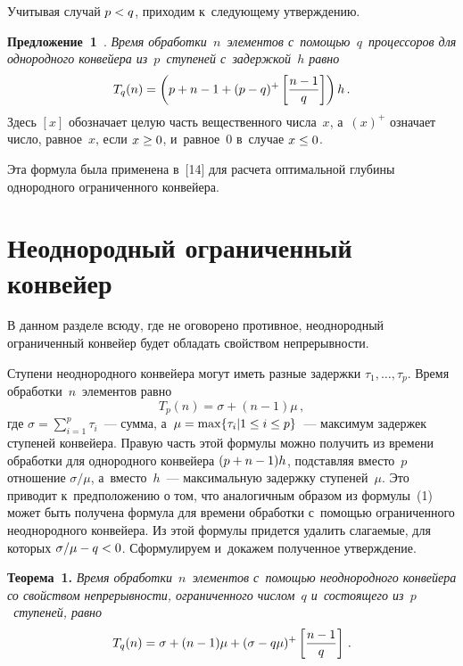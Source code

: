 \begin{multicols}{2}

\vspace*{9pt}

  
  Учитывая случай $p\hm<q$, приходим к~следующему утверждению.
  
  \smallskip
  
  \noindent
  \textbf{Предложение~1}~\cite[Prop.~1]{14-h}. \textit{Время 
обработки~$n$~элементов с~помощью~$q$~процессоров для однородного 
конвейера из~$p$~ступеней с~задержкой~$h$ равно}
  \begin{equation}
  T_q(n)=\left( p+n-1+(p-q)^+\left[ \displaystyle\frac{\displaystyle n-1\mathstrut}{\displaystyle q\mathstrut}\right]\right)h\,.
  \label{e1-h}
  \end{equation}
  Здесь $[x]$ обозначает целую часть вещественного чис\-ла~$x$, а~$(x)^+$ 
означает чис\-ло, равное~$x$, если $x\hm\geq0$, и~равное~0 в~случае 
$x\hm\leq 0$. 
  
  Эта формула была применена в~[14] для расчета оптимальной глубины 
однородного ограниченного конвейера. 

\section{Неоднородный ограниченный конвейер}

  В данном разделе всюду, где не оговорено противное, неоднородный 
ограниченный конвейер будет обладать свойством непрерывности. 
  
  Ступени неоднородного конвейера могут иметь разные задержки 
$\tau_1,\ldots , \tau_p$. Время обработки~$n$~элементов равно
  $$
  T_p(n)=\sigma+(n-1)\mu\,,
  $$
где $\sigma =\sum\nolimits^p_{i=1} \tau_i$~--- сумма, а~$\mu\hm=\max \{ 
\tau_i\vert 1\hm\leq i\hm\leq p\}$~--- максимум задержек ступеней конвейера. 
Правую часть этой формулы можно получить из времени обработки для 
однородного конвейера $(p\hm+n\hm-1)h$, подставляя вместо~$p$ 
отношение $\sigma/\mu$, а~вместо~$h$~--- максимальную задержку 
ступеней~$\mu$. Это приводит к~предположению о том, что аналогичным 
образом из формулы~(1) может быть получена формула для времени 
обработки с~помощью ограниченного неоднородного конвейера. Из этой 
формулы придется удалить слагаемые, для которых $\sigma/\mu\hm- 
q\hm<0$.    Сформулируем и~докажем полученное утверждение. 

\smallskip

\noindent
  \textbf{Теорема~1.} \textit{Время обработки~$n$~элементов  
с~по\-мощью неоднородного конвейера со свойством не\-пре\-рыв\-ности, 
ограниченного числом~$q$ и~состоящего из~$p$~ступеней, равно}
  \begin{equation}
  T_q(n)=\sigma +(n-1)\mu +(\sigma-q\mu)^+\left[ \displaystyle\frac{\displaystyle n-1\mathstrut}{\displaystyle q\mathstrut}\right]\,.
  \label{e2-h}
  \end{equation}
  

\end{multicols}
